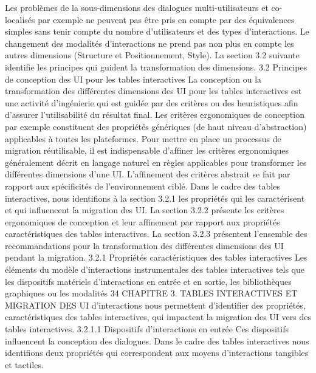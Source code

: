 \documentclass{article}
\begin{document}
Les probl\`{e}mes de la sous-dimensions des dialogues multi-utilisateurs et co-localis\'{e}s par exemple
ne peuvent pas \^{e}tre pris en compte par des \'{e}quivalences simples sans tenir compte du nombre d’utilisateurs et des types d’interactions. Le changement des modalit\'{e}s d’interactions ne prend pas non plus
en compte les autres dimensions (Structure et Positionnement, Style). La section 3.2 suivante identiﬁe
les principes qui guident la transformation des dimensions.
3.2
Principes de conception des UI pour les tables interactives
La conception ou la transformation des diff\'{e}rentes dimensions des UI pour les tables interactives
est une activit\'{e} d’ing\'{e}nierie qui est guid\'{e}e par des crit\`{e}res ou des heuristiques aﬁn d’assurer l’utilisabilit\'{e} du r\'{e}sultat ﬁnal. Les crit\`{e}res ergonomiques de conception par exemple constituent des propri\'{e}t\'{e}s
g\'{e}n\'{e}riques (de haut niveau d’abstraction) applicables \`{a} toutes les plateformes. Pour mettre en place
un processus de migration r\'{e}utilisable, il est indispensable d’afﬁner les crit\`{e}res ergonomiques g\'{e}n\'{e}ralement d\'{e}crit en langage naturel en r\`{e}gles applicables pour transformer les diff\'{e}rentes dimensions
d’une UI.
L’afﬁnement des crit\`{e}res abstrait se fait par rapport aux sp\'{e}ciﬁcit\'{e}s de l’environnement cibl\'{e}. Dans
le cadre des tables interactives, nous identiﬁons \`{a} la section 3.2.1 les propri\'{e}t\'{e}s qui les caract\'{e}risent et
qui inﬂuencent la migration des UI. La section 3.2.2 pr\'{e}sente les crit\`{e}res ergonomiques de conception
et leur afﬁnement par rapport aux propri\'{e}t\'{e}s caract\'{e}ristiques des tables interactives. La section 3.2.3
pr\'{e}sentent l’ensemble des recommandations pour la transformation des diff\'{e}rentes dimensions des UI
pendant la migration.
3.2.1
Propri\'{e}t\'{e}s caract\'{e}ristiques des tables interactives
Les \'{e}l\'{e}ments du mod\`{e}le d’interactions instrumentales des tables interactives tels que les dispositifs mat\'{e}riels d’interactions en entr\'{e}e et en sortie, les biblioth\`{e}ques graphiques ou les modalit\'{e}s
34
CHAPITRE 3. TABLES INTERACTIVES ET MIGRATION DES UI
d’interactions nous permettent d’identiﬁer des propri\'{e}t\'{e}s, caract\'{e}ristiques des tables interactives, qui
impactent la migration des UI vers des tables interactives.
3.2.1.1
Dispositifs d’interactions en entr\'{e}e
Ces dispositifs inﬂuencent la conception des dialogues. Dans le cadre des tables interactives nous
identiﬁons deux propri\'{e}t\'{e}s qui correspondent aux moyens d’interactions tangibles et tactiles.
\end{document}

